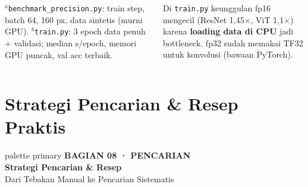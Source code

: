 \documentclass[t,aspectratio=169,xcolor={dvipsnames,table}]{beamer}
\newcommand{\bagian}[3]{%
\begin{frame}[plain]
  \begin{beamercolorbox}[wd=\paperwidth,ht=\paperheight,sep=1.5cm]{palette primary}
    \vspace{1.5cm}
    {\scriptsize\bfseries\color{dlMute}#1}\\[0.4cm]
    {\Huge\bfseries #2}\\[0.4cm]
    {\small\color{dlHairline}#3}
    \vfill
  \end{beamercolorbox}
\end{frame}}
\begin{document}
\begin{frame}
\begin{columns}[T]
        \vspace{0.12cm}
        {\scriptsize $^{a}$\texttt{benchmark\_precision.py}: train step, batch 64, 160 px, data sintetis (murni GPU). $^{b}$\texttt{train.py}: 3 epoch data penuh + validasi; median s/epoch, memori GPU puncak, val acc terbaik.}

        \vspace{0.05cm}
        {\scriptsize Di \texttt{train.py} keunggulan fp16 mengecil (ResNet 1,45$\times$, ViT 1,1$\times$) karena \textbf{loading data di CPU} jadi bottleneck. fp32 sudah memakai TF32 untuk konvolusi (bawaan PyTorch).}
    \end{columns}
\end{frame}

\section{Strategi Pencarian \& Resep Praktis}
\bagian{BAGIAN 08 · PENCARIAN}{Strategi Pencarian \& Resep}{Dari Tebakan Manual ke Pencarian Sistematis}
\end{document}
